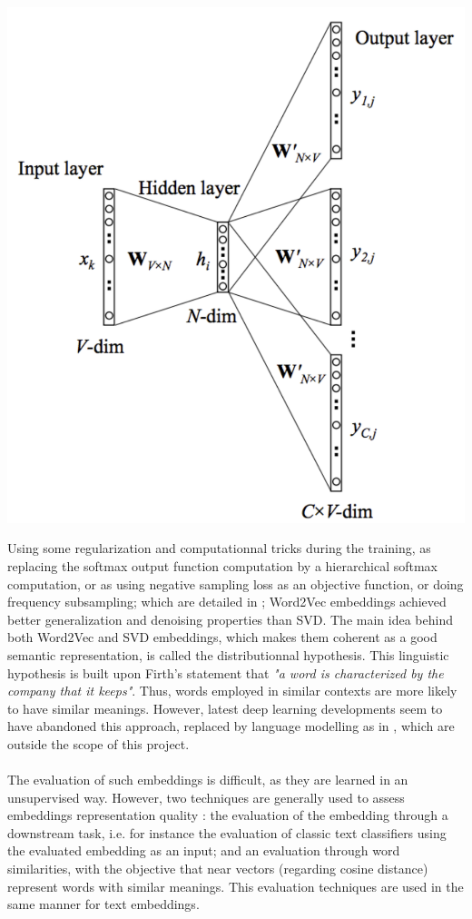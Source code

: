 \documentclass{article}
\begin{document}
\begin{center}
    \includegraphics[scale=0.4]{skip-arch}
    \label{skip-arch}
\end{center}
Using some regularization and computationnal tricks during the training,
as replacing the softmax output function computation by a 
hierarchical softmax computation, or as using negative sampling loss
as an objective function, or doing frequency subsampling; which are 
detailed in \cite{Mikolov2013}; Word2Vec embeddings achieved better 
generalization and denoising properties than SVD. The main 
idea behind both Word2Vec and SVD embeddings, which makes them 
coherent as a good semantic representation, is called 
the distributionnal hypothesis. This linguistic hypothesis is built upon
Firth's statement that \textit{"a word is characterized by the 
company that it keeps"}. Thus, words employed in similar contexts
are more likely to have similar meanings. However, latest deep learning 
developments seem to have abandoned this approach, replaced by language modelling
as in \cite{howard2018universal, Peters_2018, devlin2018bert}, which 
are outside the scope of this project. \\ \\
The evaluation of such embeddings is difficult, as they are learned in an 
unsupervised way. However, two techniques are generally used to assess
embeddings representation quality : the evaluation of the embedding through
a downstream task, i.e. for instance the evaluation of classic text classifiers 
using the evaluated embedding as an input; and an evaluation through 
word similarities, with the objective that near vectors (regarding 
cosine distance) represent words with similar meanings. This evaluation
techniques are used in the same manner for text embeddings.
\end{document}
